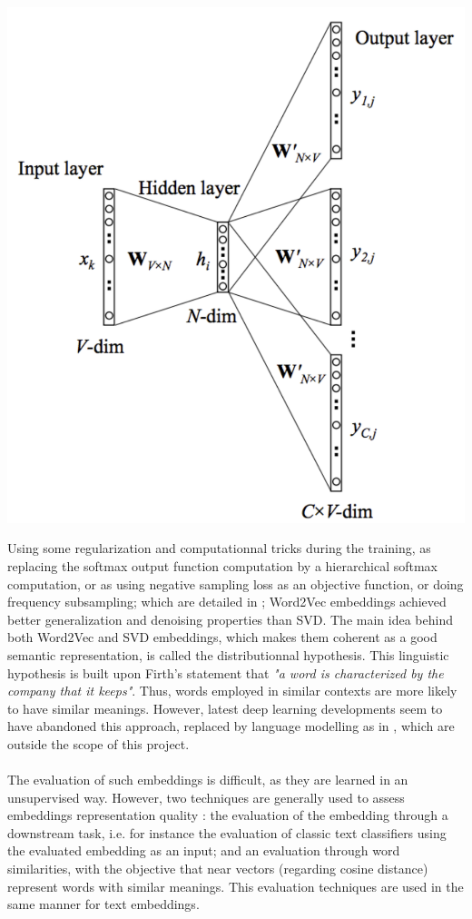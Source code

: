 \documentclass{article}
\begin{document}
\begin{center}
    \includegraphics[scale=0.4]{skip-arch}
    \label{skip-arch}
\end{center}
Using some regularization and computationnal tricks during the training,
as replacing the softmax output function computation by a 
hierarchical softmax computation, or as using negative sampling loss
as an objective function, or doing frequency subsampling; which are 
detailed in \cite{Mikolov2013}; Word2Vec embeddings achieved better 
generalization and denoising properties than SVD. The main 
idea behind both Word2Vec and SVD embeddings, which makes them 
coherent as a good semantic representation, is called 
the distributionnal hypothesis. This linguistic hypothesis is built upon
Firth's statement that \textit{"a word is characterized by the 
company that it keeps"}. Thus, words employed in similar contexts
are more likely to have similar meanings. However, latest deep learning 
developments seem to have abandoned this approach, replaced by language modelling
as in \cite{howard2018universal, Peters_2018, devlin2018bert}, which 
are outside the scope of this project. \\ \\
The evaluation of such embeddings is difficult, as they are learned in an 
unsupervised way. However, two techniques are generally used to assess
embeddings representation quality : the evaluation of the embedding through
a downstream task, i.e. for instance the evaluation of classic text classifiers 
using the evaluated embedding as an input; and an evaluation through 
word similarities, with the objective that near vectors (regarding 
cosine distance) represent words with similar meanings. This evaluation
techniques are used in the same manner for text embeddings.
\end{document}
